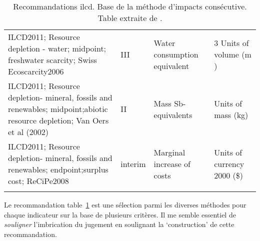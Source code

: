 {\begin{longtable}{|p{5.5cm}|p{1.2cm}|p{3cm}|p{2.8cm}|}
	      ILCD2011; Resource depletion - water; midpoint; freshwater scarcity; Swiss Ecoscarcity2006&III&Water consumption equivalent&3 Units of volume (m )\\
	      ILCD2011; Resource depletion- mineral, fossils and renewables; midpoint;abiotic resource depletion; Van Oers et al (2002)&II&Mass Sb-equivalents&Units of mass (kg)\\
	      ILCD2011; Resource depletion- mineral, fossils and renewables; endpoint;surplus cost; ReCiPe2008&interim&Marginal increase of costs&Units of currency 2000 (\$) \\
	      \hline
	      \caption{Recommandations ilcd. Base de la méthode d'impacts consécutive. Table extraite de \citetitle{european_commission_characterisation_2012} \cite{european_commission_characterisation_2012}.}
    	  \label{tab:methode_ilcd2011_recommendation}
	      \end{longtable}
}
  Le recommandation table~\ref{tab:methode_ilcd2011_recommendation} est une sélection parmi les diverses méthodes pour chaque indicateur sur la base de plusieurs critères.
  Il me semble essentiel de \emph{souligner} l'imbrication du jugement en soulignant la `construction' de cette recommandation.
  \cite{jrc_ilcd_2011}
  
